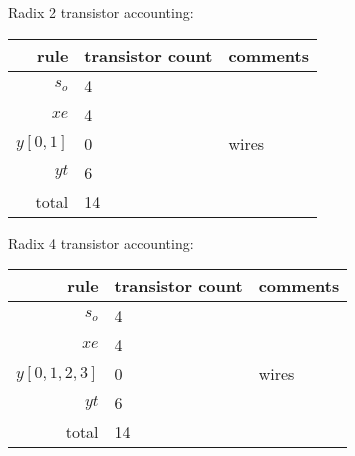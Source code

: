 \documentclass{article}
\begin{document}
\noindent Radix 2 transistor accounting: 

\begin{center}
    \begin{tabular}{|r|l|l|}
    \hline
    rule & transistor count & comments \\ \hline
    $s_o$ & 4 & \\ \hline
    $xe$ & 4 & \\ \hline
    $y[0,1]$ & 0 & wires \\ \hline
    $yt$ & 6 & \\ \hline \hline
    total & 14 & \\ \hline
    \end{tabular}
\end{center}

\noindent Radix 4 transistor accounting: 

\begin{center}
    \begin{tabular}{|r|l|l|}
    \hline
    rule & transistor count & comments \\ \hline
    $s_o$ & 4 & \\ \hline
    $xe$ & 4 & \\ \hline
    $y[0,1,2,3]$ & 0 & wires \\ \hline
    $yt$ & 6 & \\ \hline \hline
    total & 14 & \\ \hline
    \end{tabular}
\end{center}

\end{document}
